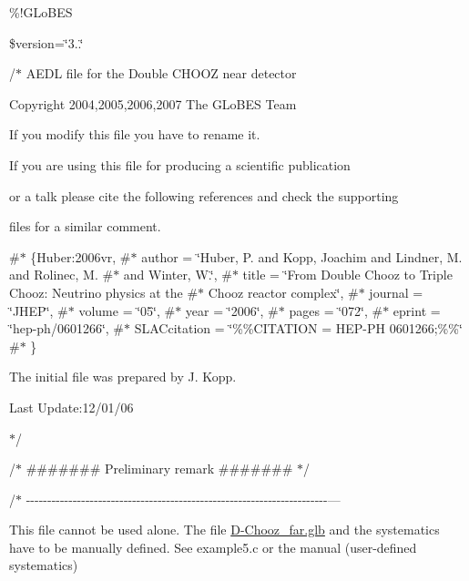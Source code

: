 \%!\+G\+Lo\+B\+ES

\$version=\char`\"{}3..\char`\"{}

/$\ast$ A\+E\+DL file for the Double C\+H\+O\+OZ near detector
\begin{DoxyItemize}
\item 
\item Copyright 2004,2005,2006,2007 The G\+Lo\+B\+ES Team
\item 
\item If you modify this file you have to rename it.
\item 
\item If you are using this file for producing a scientific publication
\item or a talk please cite the following references and check the supporting
\item files for a similar comment.
\item \#$\ast$ \{Huber\+:2006vr, \#$\ast$ author = \char`\"{}\+Huber, P. and Kopp, Joachim and Lindner, M. and Rolinec, M.
 \#$\ast$                 and Winter, W.\char`\"{}, \#$\ast$ title = \char`\"{}\+From Double Chooz to Triple Chooz\+: Neutrino physics at the
 \#$\ast$                 Chooz  reactor complex\char`\"{}, \#$\ast$ journal = \char`\"{}\+J\+H\+E\+P\char`\"{}, \#$\ast$ volume = \char`\"{}05\char`\"{}, \#$\ast$ year = \char`\"{}2006\char`\"{}, \#$\ast$ pages = \char`\"{}072\char`\"{}, \#$\ast$ eprint = \char`\"{}hep-\/ph/0601266\char`\"{}, \#$\ast$ S\+L\+A\+Ccitation = \char`\"{}\%\%\+C\+I\+T\+A\+T\+I\+O\+N = H\+E\+P-\/\+P\+H 0601266;\%\%\char`\"{} \#$\ast$ \}
\item The initial file was prepared by J. Kopp.
\item 
\item Last Update\+:12/01/06
\item $\ast$/
\end{DoxyItemize}

/$\ast$ \#\#\#\#\#\#\# Preliminary remark \#\#\#\#\#\#\# $\ast$/

/$\ast$ -\/-\/-\/-\/-\/-\/-\/-\/-\/-\/-\/-\/-\/-\/-\/-\/-\/-\/-\/-\/-\/-\/-\/-\/-\/-\/-\/-\/-\/-\/-\/-\/-\/-\/-\/-\/-\/-\/-\/-\/-\/-\/-\/-\/-\/-\/-\/-\/-\/-\/-\/-\/-\/-\/-\/-\/-\/-\/-\/-\/-\/-\/-\/-\/-\/-\/-\/-\/-\/-\/-\/---

This file cannot be used alone. The file \hyperlink{D-Chooz__far_8glb}{D-\/\+Chooz\+\_\+far.\+glb} and the systematics have to be manually defined. See example5.\+c or the manual (user-\/defined systematics) 



